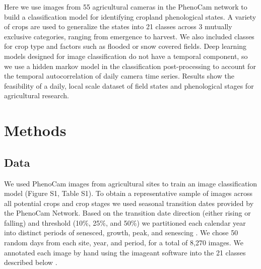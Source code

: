 \documentclass{article}
\begin{document}
Here we use images from 55 agricultural cameras in the PhenoCam network to build a classification model for identifying cropland phenological states. A variety of crops are used to generalize the states into 21 classes across 3 mutually exclusive categories, ranging from emergence to harvest. We also included classes for crop type and factors such as flooded or snow covered fields. Deep learning models designed for image classification do not have a temporal component, so we use a hidden markov model in the classification post-processing to account for the temporal autocorrelation of daily camera time series. Results show the feasibility of a daily, local scale dataset of field states and phenological stages for agricultural research.


\section{Methods}
\subsection{Data}

We used PhenoCam images from agricultural sites to train an image classification model (Figure S1, Table S1). To obtain a representative sample of images across all potential crops and crop stages we used seasonal transition dates provided by the PhenoCam Network. Based on the transition date direction (either rising or falling) and threshold (10\%, 25\%, and 50\%) we partitioned each calendar year into distinct periods of senesced, growth, peak, and senescing \citep{richardson2018a}. We chose 50 random days from each site, year, and period, for a total of 8,270 images. We annotated each image by hand using the imageant software into the 21 classes described below \citep{barve2019}.
\end{document}

